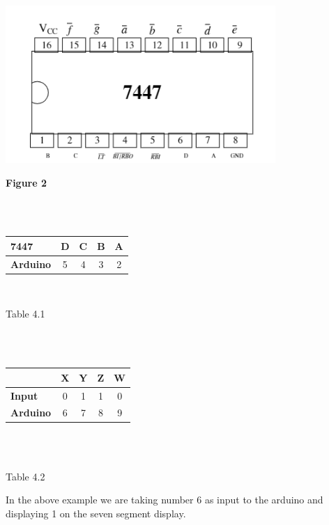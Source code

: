 \documentclass[journal,12pt,twocolumn]{IEEEtran}
\begin{document}
\includegraphics{ic fig.png}
\begin{center}

\textbf{Figure 2} \\
\
\end{center}
\centering
\
\begin{tabular}{|l|c|c|c|c|}
\hline
\textbf{7447} & D & C & B & A\\
\hline
\textbf{Arduino} & 5 & 4 & 3 & 2\\
\hline
\end{tabular}
\
\centerline{Table 4.1}\\
\
\centering
\\\begin{tabular}{|l|c|c|c|c|}
\hline
& X & Y & Z & W\\
\hline
\textbf{Input} & 0 & 1 & 1 & 0\\
\hline
\textbf{Arduino} & 6 & 7 & 8 & 9\\
\hline
\end{tabular}\\
\
\centerline{Table 4.2}
\raggedright
In the above example we are taking number 6 as input to the arduino and displaying 1 on the seven segment display.
\end{document}
